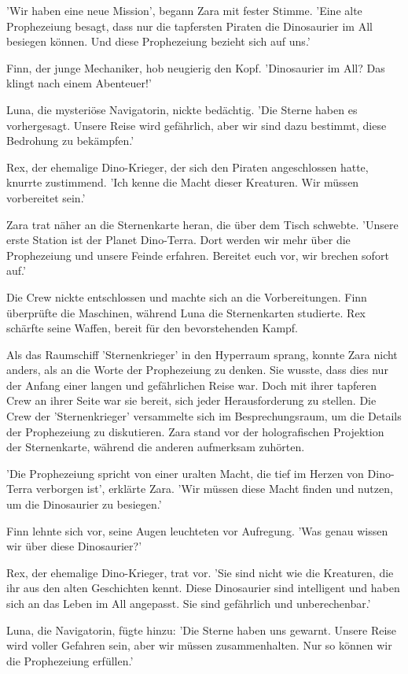 \documentclass[12pt]{article}
\begin{document}
'Wir haben eine neue Mission', begann Zara mit fester Stimme. 'Eine alte Prophezeiung besagt, dass nur die tapfersten Piraten die Dinosaurier im All besiegen können. Und diese Prophezeiung bezieht sich auf uns.'

Finn, der junge Mechaniker, hob neugierig den Kopf. 'Dinosaurier im All? Das klingt nach einem Abenteuer!'

Luna, die mysteriöse Navigatorin, nickte bedächtig. 'Die Sterne haben es vorhergesagt. Unsere Reise wird gefährlich, aber wir sind dazu bestimmt, diese Bedrohung zu bekämpfen.'

Rex, der ehemalige Dino-Krieger, der sich den Piraten angeschlossen hatte, knurrte zustimmend. 'Ich kenne die Macht dieser Kreaturen. Wir müssen vorbereitet sein.'

Zara trat näher an die Sternenkarte heran, die über dem Tisch schwebte. 'Unsere erste Station ist der Planet Dino-Terra. Dort werden wir mehr über die Prophezeiung und unsere Feinde erfahren. Bereitet euch vor, wir brechen sofort auf.'

Die Crew nickte entschlossen und machte sich an die Vorbereitungen. Finn überprüfte die Maschinen, während Luna die Sternenkarten studierte. Rex schärfte seine Waffen, bereit für den bevorstehenden Kampf.

Als das Raumschiff 'Sternenkrieger' in den Hyperraum sprang, konnte Zara nicht anders, als an die Worte der Prophezeiung zu denken. Sie wusste, dass dies nur der Anfang einer langen und gefährlichen Reise war. Doch mit ihrer tapferen Crew an ihrer Seite war sie bereit, sich jeder Herausforderung zu stellen. Die Crew der 'Sternenkrieger' versammelte sich im Besprechungsraum, um die Details der Prophezeiung zu diskutieren. Zara stand vor der holografischen Projektion der Sternenkarte, während die anderen aufmerksam zuhörten.

'Die Prophezeiung spricht von einer uralten Macht, die tief im Herzen von Dino-Terra verborgen ist', erklärte Zara. 'Wir müssen diese Macht finden und nutzen, um die Dinosaurier zu besiegen.'

Finn lehnte sich vor, seine Augen leuchteten vor Aufregung. 'Was genau wissen wir über diese Dinosaurier?'

Rex, der ehemalige Dino-Krieger, trat vor. 'Sie sind nicht wie die Kreaturen, die ihr aus den alten Geschichten kennt. Diese Dinosaurier sind intelligent und haben sich an das Leben im All angepasst. Sie sind gefährlich und unberechenbar.'

Luna, die Navigatorin, fügte hinzu: 'Die Sterne haben uns gewarnt. Unsere Reise wird voller Gefahren sein, aber wir müssen zusammenhalten. Nur so können wir die Prophezeiung erfüllen.'
\end{document}
